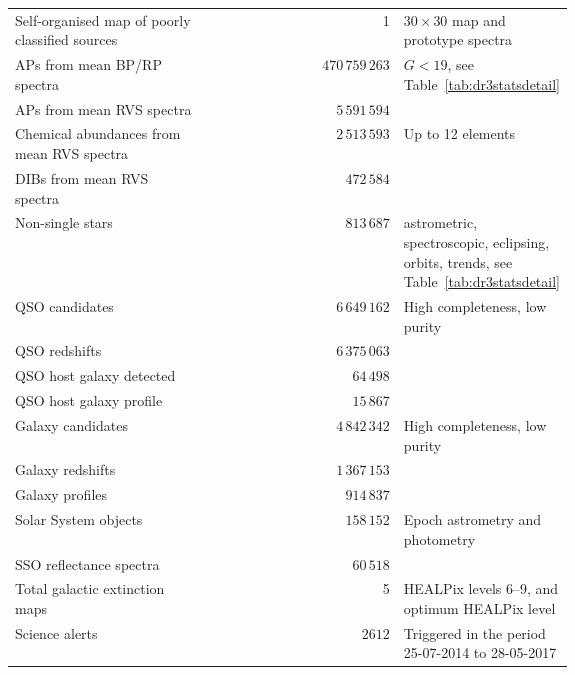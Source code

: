 \documentclass[longauth]{aa}
\providecommand\gmag{\ensuremath{G}\xspace}
\providecommand\tabref[1]{Table~\ref{#1}}
\newcommand{\gdrthreeapsfromxp}{\ensuremath{470\,759\,263}\xspace}
\newcommand{\gdrthreeapsfromrvs}{\ensuremath{5\,591\,594}\xspace}
\newcommand{\gdrthreeabunfromrvs}{\ensuremath{2\,513\,593}\xspace}
\newcommand{\gdrthreedibs}{\ensuremath{472\,584}\xspace}
\newcommand{\gdrthreenss}{\ensuremath{813\,687}\xspace}
\newcommand{\gdrthreeqsocandidates}{\ensuremath{6\,649\,162}\xspace}
\newcommand{\gdrthreeqsoredshifts}{\ensuremath{6\,375\,063}\xspace}
\newcommand{\gdrthreeqsohosts}{\ensuremath{64\,498}\xspace}
\newcommand{\gdrthreeqsohostprofile}{\ensuremath{15\,867}\xspace}
\newcommand{\gdrthreegalaxycandidates}{\ensuremath{4\,842\,342}\xspace}
\newcommand{\gdrthreegalaxyredshifts}{\ensuremath{1\,367\,153}\xspace}
\newcommand{\gdrthreegalaxyprofile}{\ensuremath{914\,837}\xspace}
\newcommand{\gdrthreesso}{\ensuremath{158\,152}\xspace}
\newcommand{\gdrthreessoreflectance}{\ensuremath{60\,518}\xspace}
\newcommand{\gdrthreealerts}{\ensuremath{2612}\xspace}
\begin{document}
\begin{table}[t!]
\begin{tabular}{>{\raggedright}p{0.35\linewidth}r>{\raggedright\arraybackslash}p{0.3\linewidth}}
     Self-organised map of poorly classified sources & 1 & $30\times30$ map and prototype spectra\\
    APs from mean BP/RP spectra & \gdrthreeapsfromxp & $\gmag<19$, see \tabref{tab:dr3statsdetail} \\
    APs from mean RVS spectra & \gdrthreeapsfromrvs & \\
    Chemical abundances from mean RVS spectra &\gdrthreeabunfromrvs  & Up to 12 elements \\
    DIBs from mean RVS spectra & \gdrthreedibs & \\
    Non-single stars & \gdrthreenss & astrometric, spectroscopic, eclipsing, orbits, trends, see
    \tabref{tab:dr3statsdetail} \\
    QSO candidates & \gdrthreeqsocandidates & High completeness, low purity \\
    QSO redshifts & \gdrthreeqsoredshifts & \\
    QSO host galaxy detected & \gdrthreeqsohosts & \\
    QSO host galaxy profile & \gdrthreeqsohostprofile & \\
    Galaxy candidates & \gdrthreegalaxycandidates & High completeness, low purity \\
    Galaxy redshifts & \gdrthreegalaxyredshifts & \\
    Galaxy profiles & \gdrthreegalaxyprofile & \\
    Solar System objects & \gdrthreesso & Epoch astrometry and photometry \\
    SSO reflectance spectra & \gdrthreessoreflectance & \\
    Total galactic extinction maps & 5 & HEALPix levels 6--9, and optimum HEALPix level \\
    Science alerts & \gdrthreealerts & Triggered in the period 25-07-2014 to 28-05-2017 \\
    \hline
  \end{tabular}
\end{table}
\end{document}
